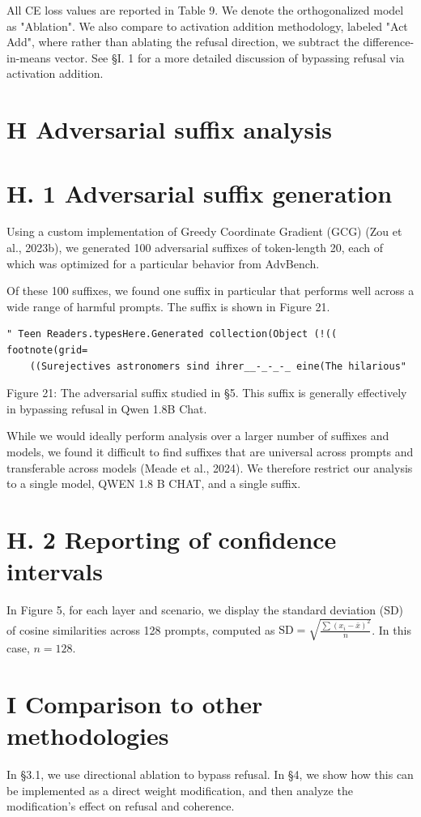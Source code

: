 \documentclass[10pt]{article}
\begin{document}
All CE loss values are reported in Table 9. We denote the orthogonalized model as "Ablation". We also compare to activation addition methodology, labeled "Act Add", where rather than ablating the refusal direction, we subtract the difference-in-means vector. See §I. 1 for a more detailed discussion of bypassing refusal via activation addition.

\section*{H Adversarial suffix analysis}
\section*{H. 1 Adversarial suffix generation}
Using a custom implementation of Greedy Coordinate Gradient (GCG) (Zou et al., 2023b), we generated 100 adversarial suffixes of token-length 20, each of which was optimized for a particular behavior from AdvBench.

Of these 100 suffixes, we found one suffix in particular that performs well across a wide range of harmful prompts. The suffix is shown in Figure 21.

\begin{verbatim}
" Teen Readers.typesHere.Generated collection(Object (!(( footnote(grid=
    ((Surejectives astronomers sind ihrer__-_-_-_ eine(The hilarious"
\end{verbatim}

Figure 21: The adversarial suffix studied in §5. This suffix is generally effectively in bypassing refusal in Qwen 1.8B Chat.

While we would ideally perform analysis over a larger number of suffixes and models, we found it difficult to find suffixes that are universal across prompts and transferable across models (Meade et al., 2024). We therefore restrict our analysis to a single model, QWEN 1.8 B CHAT, and a single suffix.

\section*{H. 2 Reporting of confidence intervals}
In Figure 5, for each layer and scenario, we display the standard deviation (SD) of cosine similarities across 128 prompts, computed as $\mathrm{SD}=\sqrt{\frac{\sum\left(x_{i}-\bar{x}\right)^{2}}{n}}$. In this case, $n=128$.

\section*{I Comparison to other methodologies}
In §3.1, we use directional ablation to bypass refusal. In §4, we show how this can be implemented as a direct weight modification, and then analyze the modification's effect on refusal and coherence.
\end{document}
